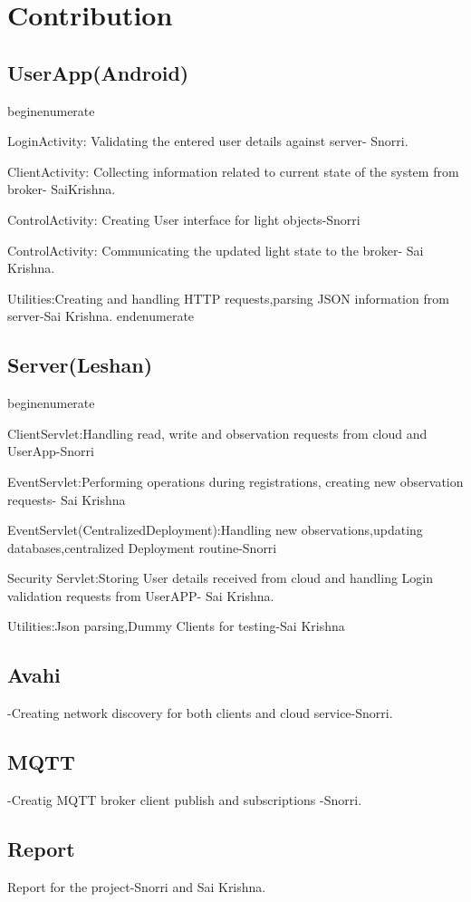 \section{Contribution}
\subsection{UserApp(Android)}
begin{enumerate}
\item LoginActivity: Validating the entered user details against server- Snorri.
\item ClientActivity: Collecting information related to current state of the system from broker- SaiKrishna.
\item ControlActivity: Creating User interface for light objects-Snorri
\item  ControlActivity: Communicating the updated light state to the broker- Sai Krishna.
\item Utilities:Creating and handling HTTP requests,parsing JSON information from server-Sai Krishna.
end{enumerate}

\subsection{Server(Leshan)}
begin{enumerate}
\item ClientServlet:Handling read, write and observation requests from cloud and UserApp-Snorri
\item EventServlet:Performing operations during registrations, creating new observation requests- Sai Krishna

\item EventServlet(CentralizedDeployment):Handling new observations,updating databases,centralized Deployment routine-Snorri

\item Security Servlet:Storing User details received from cloud and handling Login validation requests from UserAPP- Sai Krishna.

\item Utilities:Json parsing,Dummy Clients for testing-Sai Krishna

\subsection{Avahi}-Creating network discovery for both clients and cloud service-Snorri.
\subsection{MQTT}-Creatig MQTT broker client publish and subscriptions -Snorri.

\subsection{Report} Report for the project-Snorri and Sai Krishna.